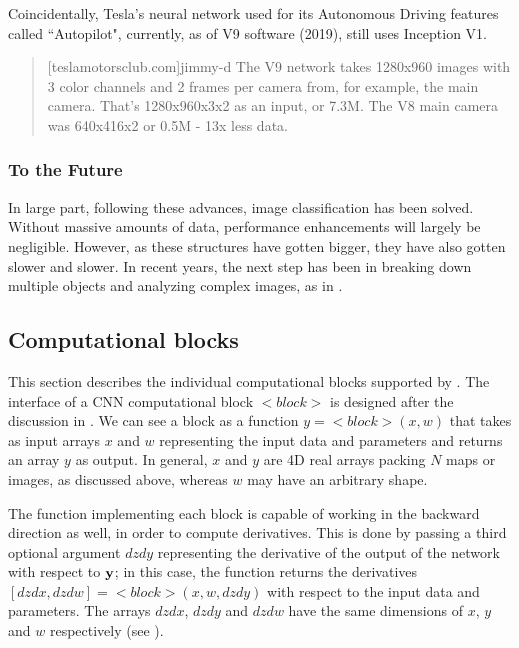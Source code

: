Coincidentally, Tesla's neural network used for its Autonomous Driving features called “Autopilot", currently, as of V9 software (2019), still uses Inception V1.
\begin{quote}[teslamotorsclub.com]{jimmy-d}
	The V9 network takes 1280x960 images with 3 color channels and 2 frames per camera from, for example, the main camera. That’s 1280x960x3x2 as an input, or 7.3M. The V8 main camera was 640x416x2 or 0.5M - 13x less data.
\end{quote}

\subsubsection{To the Future}
In large part, following these advances, image classification has been solved. Without massive amounts of data, performance enhancements will largely be negligible. However, as these structures have gotten bigger, they have also gotten slower and slower. In recent years, the next step has been in breaking down multiple objects and analyzing complex images, as in .




\subsection{Computational blocks}\label{s:blocks}

This section describes the individual computational blocks supported by \maskrcnn. The interface of a CNN computational block $<block>$ is designed after the discussion in . We can see a block as a function $y =<block>(x,w)$ that takes as input  arrays $x$ and $w$ representing the input data and parameters and returns an array $y$ as output. In general, $x$ and $y$ are 4D real arrays packing $N$ maps or images, as discussed above, whereas $w$ may have an arbitrary shape.

The function implementing each block is capable of working in the backward direction as well, in order to compute derivatives. This is done by passing a third optional argument $dzdy$ representing the derivative of the output of the network with respect to $\mathbf{y}$; in this case, the function returns the derivatives $[dzdx,dzdw] = <block>(x,w,dzdy)$ with respect to the input data and parameters. The arrays $dzdx$, $dzdy$ and $dzdw$ have the same dimensions of $x$, $y$ and $w$ respectively (see ).

